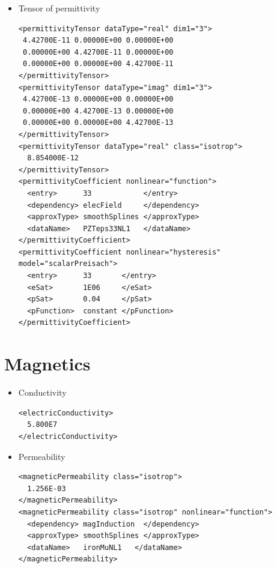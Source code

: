 \begin{itemize}

\item Tensor of permittivity
\begin{verbatim}
<permittivityTensor dataType="real" dim1="3">
 4.42700E-11 0.00000E+00 0.00000E+00
 0.00000E+00 4.42700E-11 0.00000E+00
 0.00000E+00 0.00000E+00 4.42700E-11
</permittivityTensor>
<permittivityTensor dataType="imag" dim1="3">
 4.42700E-13 0.00000E+00 0.00000E+00
 0.00000E+00 4.42700E-13 0.00000E+00
 0.00000E+00 0.00000E+00 4.42700E-13
</permittivityTensor>
<permittivityTensor dataType="real" class="isotrop">
  8.854000E-12
</permittivityTensor>
<permittivityCoefficient nonlinear="function">
  <entry>      33            </entry>
  <dependency> elecField     </dependency>
  <approxType> smoothSplines </approxType>
  <dataName>   PZTeps33NL1   </dataName>
</permittivityCoefficient>
<permittivityCoefficient nonlinear="hysteresis" model="scalarPreisach">
  <entry>      33       </entry>
  <eSat>       1E06     </eSat>
  <pSat>       0.04     </pSat>
  <pFunction>  constant </pFunction>
</permittivityCoefficient>
\end{verbatim}
\end{itemize}

\section{Magnetics}

\begin{itemize}
\item Conductivity
\begin{verbatim}
<electricConductivity>
  5.800E7
</electricConductivity>
\end{verbatim}

\item Permeability
\begin{verbatim}
<magneticPermeability class="isotrop">
  1.256E-03
</magneticPermeability>
<magneticPermeability class="isotrop" nonlinear="function">
  <dependency> magInduction  </dependency>
  <approxType> smoothSplines </approxType>
  <dataName>   ironMuNL1   </dataName>
</magneticPermeability>
\end{verbatim}
\end{itemize}

